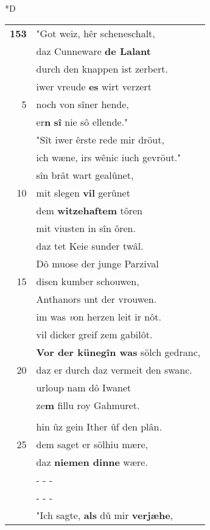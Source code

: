 \documentclass[8pt,a4paper,notitlepage]{article}
\begin{document}
\begin{table}[ht]
\begin{minipage}[t]{0.5\linewidth}
\small
\begin{center}*D
\end{center}
\begin{tabular}{rl}
\textbf{153} & "Got weiz, hêr scheneschalt,\\ 
 & daz Cunneware \textbf{de Lalant}\\ 
 & durch den knappen ist zerbert.\\ 
 & iwer vreude \textbf{es} wirt verzert\\ 
5 & noch von sîner hende,\\ 
 & er\textbf{n} \textbf{sî} nie sô ellende."\\ 
 & "Sît iwer êrste rede mir dröut,\\ 
 & ich wæne, irs wênic iuch gevröut."\\ 
 & sîn brât wart gealûnet,\\ 
10 & mit slegen \textbf{vil} gerûnet\\ 
 & dem \textbf{witzehaftem} tôren\\ 
 & mit viusten in sîn ôren.\\ 
 & daz tet Keie sunder twâl.\\ 
 & Dô muose der junge Parzival\\ 
15 & disen kumber schouwen,\\ 
 & Anthanors unt der vrouwen.\\ 
 & im was \textit{v}on herzen leit ir nôt.\\ 
 & vil dicker greif zem gabilôt.\\ 
 & \textbf{Vor der künegîn was} sölch gedranc,\\ 
20 & daz er durch daz vermeit den swanc.\\ 
 & urloup nam dô Iwanet\\ 
 & ze\textbf{m} fillu roy Gahmuret.\\ 
 & \textit{\begin{large}D\end{large}}es reise al eine wart getân\\ 
 & hin ûz gein Ither ûf den plân.\\ 
25 & dem saget er sölhiu mære,\\ 
 & daz \textbf{niemen dinne} wære.\\ 
 & \multicolumn{1}{l}{ - - - }\\ 
 & \multicolumn{1}{l}{ - - - }\\ 
 & "Ich sagte, \textbf{als} dû mir \textbf{verjæhe},\\ 

\end{tabular}
\end{minipage}
\end{table}
\end{document}
